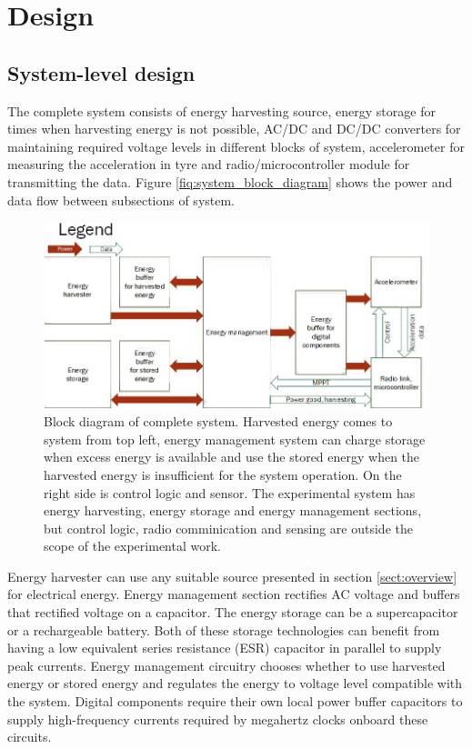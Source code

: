 \section{Design}\label{sect:design}
\subsection{System-level design}
The complete system consists of energy harvesting source, energy storage for times when harvesting energy is not possible, AC/DC and DC/DC converters for maintaining required voltage levels in different blocks of system, accelerometer for measuring the acceleration in tyre and radio/microcontroller module for transmitting the data. Figure \ref{fiq:system_block_diagram} shows the power and data flow between subsections of system. 


\begin{figure}[htb]
\begin{center}
\includegraphics[width=\columnwidth]{images/own_dwg/system_block_diagram.jpg}
\end{center}
\caption{\label{fiq:system_block_diagram} Block diagram of complete system. Harvested energy comes to system from top left, energy management system can charge storage when excess energy is available and use the stored energy when the harvested energy is insufficient for the system operation. On the right side is control logic and sensor. The experimental system has energy harvesting, energy storage and energy management sections, but control logic, radio comminication and sensing are outside the scope of the experimental work.}
\label{liitekuva}
\end{figure}

Energy harvester can use any suitable source presented in section \ref{sect:overview} for electrical energy. Energy management section rectifies AC voltage and buffers that rectified voltage on a capacitor. The energy storage can be a supercapacitor or a rechargeable battery. Both of these storage technologies can benefit from having a low equivalent series resistance (ESR) capacitor in parallel to supply peak currents. Energy management circuitry chooses whether to use harvested energy or stored energy and regulates the energy to voltage level compatible with the system. Digital components require their own local power buffer capacitors to supply high-frequency currents required by megahertz clocks onboard these circuits.

